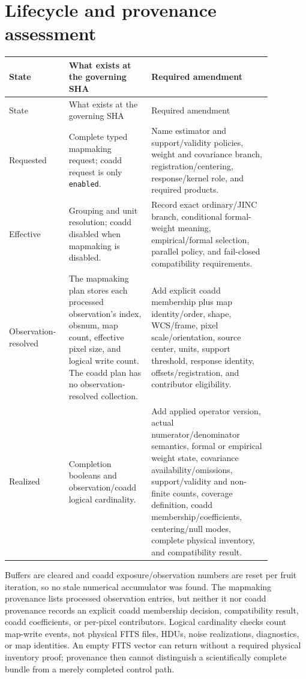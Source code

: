 \documentclass[11pt]{article}
\newcommand{\code}[1]{\nolinkurl{#1}}
\begin{document}
\section{Lifecycle and provenance assessment}

\begin{longtable}{L{0.18\linewidth}L{0.27\linewidth}L{0.42\linewidth}}
\toprule
State & What exists at the governing SHA & Required amendment\\
\midrule
\endfirsthead
\toprule
State & What exists at the governing SHA & Required amendment\\
\midrule
\endhead
Requested & Complete typed mapmaking request; coadd request is only
\code{enabled}. & Name estimator and support/validity policies, weight and
covariance branch, registration/centering, response/kernel role, and required
products.\\
Effective & Grouping and unit resolution; coadd disabled when mapmaking is
disabled. & Record exact ordinary/JINC branch, conditional formal-weight
meaning, empirical/formal selection, parallel policy, and fail-closed
compatibility requirements.\\
Observation-resolved & The mapmaking plan stores each processed observation's
index, obsnum, map count, effective pixel size, and logical write count.  The
coadd plan has no observation-resolved collection. & Add explicit coadd
membership plus map identity/order, shape, WCS/frame, pixel scale/orientation,
source center, units, support threshold, response identity,
offsets/registration, and contributor eligibility.\\
Realized & Completion booleans and observation/coadd logical cardinality. &
Add applied operator version, actual numerator/denominator semantics, formal or
empirical weight state, covariance availability/omissions, support/validity and
non-finite counts, coverage definition, coadd membership/coefficients,
centering/null modes, complete physical inventory, and compatibility result.\\
\bottomrule
\end{longtable}

Buffers are cleared and coadd exposure/observation numbers are reset per fruit
iteration, so no stale numerical accumulator was found.  The mapmaking
provenance lists processed observation entries, but neither it nor coadd
provenance records an explicit coadd membership decision, compatibility result,
coadd coefficients, or per-pixel contributors.  Logical cardinality checks
count map-write events, not physical FITS files, HDUs, noise realizations,
diagnostics, or map identities.  An empty FITS vector can return without a
required physical inventory proof; provenance then cannot distinguish a
scientifically complete bundle from a merely completed control path.
\end{document}
